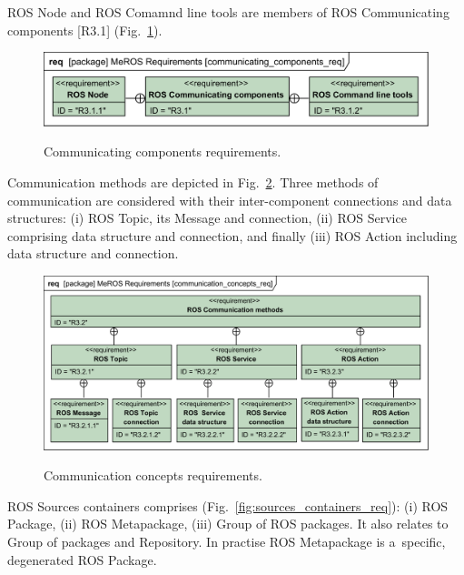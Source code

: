 \documentclass[11pt,oneside,a4paper]{report}
\begin{document}
	 ROS Node and ROS Comamnd line tools are members of ROS Communicating components [R3.1]  (Fig.~\ref{fig:communicating_components_req}).

	\begin{figure}[H]
		\centering
		\begin{center}
			{\includegraphics[scale=1.0]{diagrams/communicating_components_req.png}}
		\end{center}
		\caption{Communicating components requirements.} 
		\label{fig:communicating_components_req}
	\end{figure}
	
	Communication methods are depicted in Fig.~\ref{fig:communication_concepts_req}.
	 Three methods of communication are considered with their inter-component connections and data structures: (i) ROS Topic, its Message and connection, (ii) ROS Service comprising data structure and connection, and finally (iii) ROS Action including data structure and connection.
	
	\begin{figure}[H]
		\centering
		\begin{center}
			{\includegraphics[scale=.98]{diagrams/communication_concepts_req.png}}
		\end{center}
		\caption{Communication concepts requirements.} 
		\label{fig:communication_concepts_req}
	\end{figure}
	
	ROS Sources containers comprises (Fig.~\ref{fig:sources_containers_req}): (i) ROS Package, (ii) ROS Metapackage, (iii) Group of ROS packages. It also relates to Group of packages and Repository. In practise ROS Metapackage is a~specific, degenerated ROS Package.
	
\end{document}
